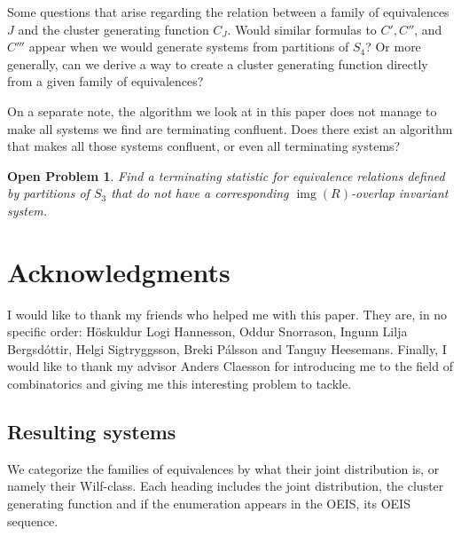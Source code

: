 \documentclass[a4paper, 11pt, english]{article}
\newtheorem{openproblem}[theorem]{Open Problem}
\theoremstyle{definition}
\newcommand{\Sym}{S}
\DeclareMathOperator{\img}{img}
\begin{document}
Some questions that arise regarding the relation between a family of equivalences $J$ and
the cluster generating function $C_J$.
Would similar formulas to $C', C''$, and $C'''$ appear when we would
generate systems from partitions of $\Sym_4$? 
Or more generally, 
can we derive a way to create a cluster generating function directly from a
given family of equivalences? 

On a separate note, the algorithm we look at in this paper does not manage to make all systems
we find are terminating confluent. Does there exist an algorithm that makes all those systems
confluent, or even all terminating systems?

\begin{openproblem}
    Find a terminating statistic for equivalence relations
    defined by partitions of $\Sym_3$ that do not have a corresponding $\img(R)$-overlap invariant system.
\end{openproblem}

\section*{Acknowledgments}
I would like to thank my friends who helped me with this paper. They are, in no specific order: Höskuldur
Logi Hannesson, Oddur Snorrason, Ingunn Lilja Bergsdóttir, Helgi Sigtryggsson, Breki Pálsson and
Tanguy Heesemans. Finally, I would like to thank my advisor Anders Claesson for introducing me to the
field of combinatorics and giving me this interesting problem to tackle.

\clearpage




\clearpage

\begin{appendices}

\clearpage

\section{Resulting systems}
We categorize the families of equivalences by what their joint
distribution is, or namely their Wilf-class.
Each heading includes the joint distribution, the cluster generating function and if the enumeration
appears in the OEIS, its OEIS sequence.

\begin{multicols}{2}

\end{multicols}
\end{appendices}
\end{document}
